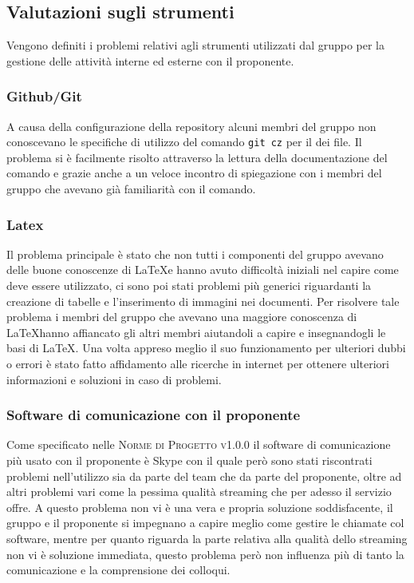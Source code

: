 \documentclass[../piano-di-qualifica.tex]{subfiles}
\begin{document}
\subsection{Valutazioni sugli strumenti}
\label{sub:valutazioni_strumenti}
Vengono definiti i problemi relativi agli strumenti utilizzati dal gruppo per la gestione delle attività interne ed esterne con il proponente.

\subsubsection{Github/Git}
\label{sub:github}
A causa della configurazione della repository alcuni membri del gruppo non conoscevano le specifiche di utilizzo del comando \texttt{git cz} per il  dei file. Il problema si è facilmente risolto attraverso la lettura della documentazione del comando e grazie anche a un veloce incontro di spiegazione con i membri del gruppo che avevano già familiarità con il comando.

\subsubsection{Latex}
\label{sub:latex}
Il problema principale è stato che non tutti i componenti del gruppo avevano delle buone conoscenze di \LaTeX e hanno avuto difficoltà iniziali nel capire come deve essere utilizzato, ci sono poi stati problemi più generici riguardanti la creazione di tabelle e l'inserimento di immagini nei documenti.
Per risolvere tale problema i membri del gruppo che avevano una maggiore conoscenza di \LaTeX hanno affiancato gli altri membri aiutandoli a capire e insegnandogli le basi di \LaTeX. Una volta appreso meglio il suo funzionamento per ulteriori dubbi o errori è stato fatto affidamento alle ricerche in internet per ottenere ulteriori informazioni e soluzioni in caso di problemi.

\subsubsection{Software di comunicazione con il proponente}
\label{sub:latex}
Come specificato nelle \textsc{Norme di Progetto v1.0.0} il software di comunicazione più usato con il proponente è Skype con il quale però sono stati riscontrati problemi nell'utilizzo sia da parte del team che da parte del proponente, oltre ad altri problemi vari come la pessima qualità streaming che per adesso il servizio offre.
A questo problema non vi è una vera e propria soluzione soddisfacente, il gruppo e il proponente si impegnano a capire meglio come gestire le chiamate col software, mentre per quanto riguarda la parte relativa alla qualità dello streaming non vi è soluzione immediata, questo problema però non influenza più di tanto la comunicazione e la comprensione dei colloqui.
\end{document}

